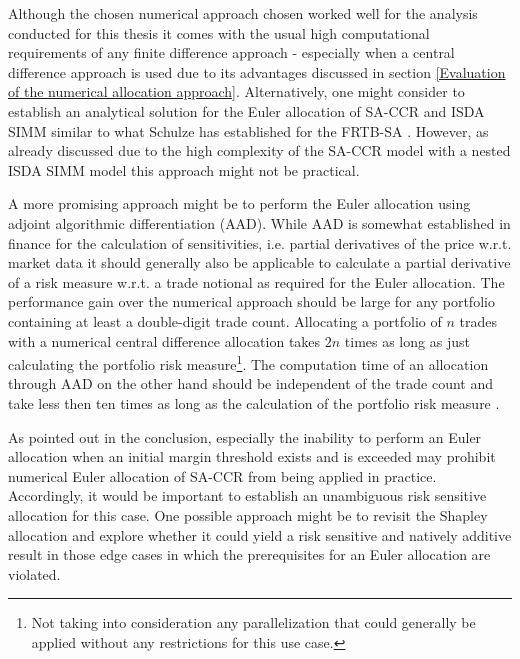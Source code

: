 \documentclass[../Thesis_AHoecherl.tex]{subfiles}
\begin{document}
Although the chosen numerical approach chosen worked well for the analysis conducted for this thesis it comes with the usual high computational requirements of any finite difference approach - especially when a central difference approach is used due to its advantages discussed in section \ref{Evaluation of the numerical allocation approach}.
Alternatively, one might consider to establish an analytical solution for the Euler allocation of \gls{SA-CCR} and \gls{ISDA SIMM} similar to what Schulze has established for the \gls{FRTB-SA} \cite{schulze2018capital}.
However, as already discussed due to the high complexity of the SA-CCR model with a nested \gls{ISDA SIMM} model this approach might not be practical.

A more promising approach might be to perform the Euler allocation using adjoint algorithmic differentiation (\gls{AAD}). 
While \gls{AAD} is somewhat established in finance for the calculation of sensitivities, i.e. partial derivatives of the price w.r.t. market data \cite{giles2006smoking} it should generally also be applicable to calculate a partial derivative of a risk measure w.r.t. a trade notional as required for the Euler allocation.
The performance gain over the numerical approach should be large for any portfolio containing at least a double-digit trade count.
Allocating a portfolio of $n$ trades with a numerical central difference allocation takes $2n$ times as long as just calculating the portfolio risk measure\footnote{Not taking into consideration any parallelization that could generally be applied without any restrictions for this use case.}.
The computation time of an allocation through \gls{AAD} on the other hand should be independent of the trade count and take less then ten times as long as the calculation of the portfolio risk measure \cite{AdaptivAAD}.

As pointed out in the conclusion, especially the inability to perform an Euler allocation when an initial margin threshold exists and is exceeded may prohibit numerical Euler allocation of SA-CCR from being applied in practice.
Accordingly, it would be important to establish an unambiguous risk sensitive allocation for this case. One possible approach might be to revisit the Shapley allocation and explore whether it could yield a risk sensitive and natively additive result in those edge cases in which the prerequisites for an Euler allocation are violated.


\end{document}
